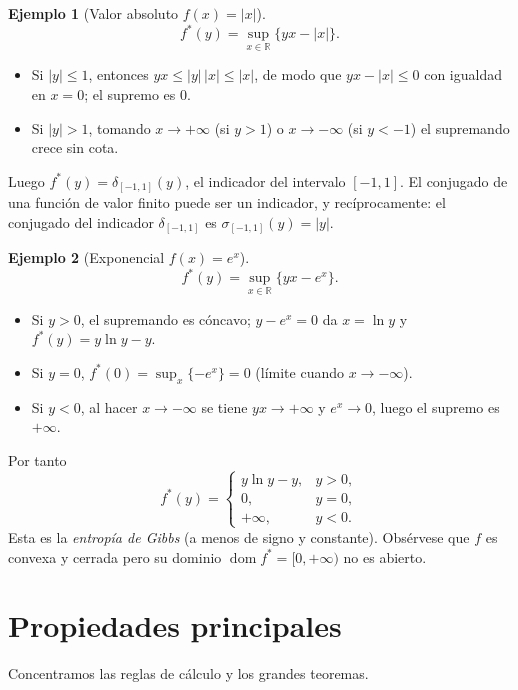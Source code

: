 \documentclass[12pt]{book}
\newcommand{\R}{\mathbb{R}}
\newcommand{\dom}{\operatorname{dom}}
\newcommand{\indic}{\delta}
\newcommand{\supp}{\sigma}
\theoremstyle{definition}
\newtheorem{ejemplo}{Ejemplo}[section]
\theoremstyle{plain}
\theoremstyle{remark}
\begin{document}
\begin{ejemplo}[Valor absoluto $f(x)=|x|$]
  \[
    f^*(y)=\sup_{x\in\R}\{yx-|x|\}.
  \]
  \begin{itemize}[leftmargin=1.2em,itemsep=1pt]
    \item Si $|y|\le 1$, entonces $yx\le |y|\,|x|\le |x|$, de modo que
          $yx-|x|\le 0$ con igualdad en $x=0$; el supremo es $0$.
    \item Si $|y|>1$, tomando $x\to +\infty$ (si $y>1$) o
          $x\to-\infty$ (si $y<-1$) el supremando crece sin cota.
  \end{itemize}
  Luego $f^*(y)=\indic_{[-1,1]}(y)$, el indicador del intervalo
  $[-1,1]$.  El conjugado de una función de valor finito puede ser un
  indicador, y recíprocamente: el conjugado del indicador
  $\indic_{[-1,1]}$ es $\supp_{[-1,1]}(y)=|y|$.
\end{ejemplo}

\begin{ejemplo}[Exponencial $f(x)=e^x$]
  \[
    f^*(y)=\sup_{x\in\R}\{yx-e^x\}.
  \]
  \begin{itemize}[leftmargin=1.2em,itemsep=1pt]
    \item Si $y>0$, el supremando es cóncavo; $y-e^x=0$ da $x=\ln y$ y
          $f^*(y)=y\ln y-y$.
    \item Si $y=0$, $f^*(0)=\sup_x\{-e^x\}=0$ (límite cuando $x\to-\infty$).
    \item Si $y<0$, al hacer $x\to-\infty$ se tiene $yx\to+\infty$ y
          $e^x\to0$, luego el supremo es $+\infty$.
  \end{itemize}
  Por tanto
  \[
    f^*(y)=
    \begin{cases}
      y\ln y - y, & y>0,\\
      0,          & y=0,\\
      +\infty,     & y<0.
    \end{cases}
  \]
  Esta es la \emph{entropía de Gibbs} (a menos de signo y constante).
  Obsérvese que $f$ es convexa y cerrada pero su dominio
  $\dom f^*=[0,+\infty)$ no es abierto.
\end{ejemplo}

\section{Propiedades principales}\label{sec:props}

Concentramos las reglas de cálculo y los grandes teoremas.
\end{document}
